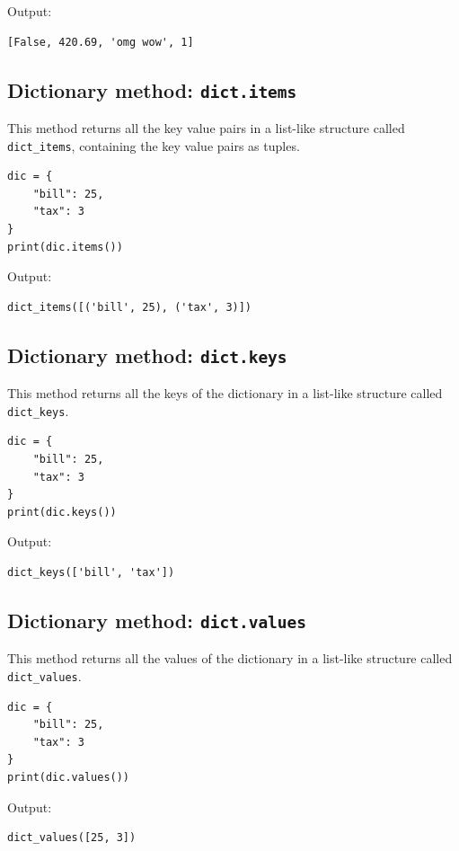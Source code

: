 \documentclass[11pt]{article}
\begin{document}
 \noindent Output:

\begin{verbatim}
[False, 420.69, 'omg wow', 1]
\end{verbatim}

\subsection{Dictionary method: \texttt{dict.items}}
\label{sec:orga9e6a05}
This method returns all the key value pairs in a list-like structure called \texttt{dict\_items}, containing the key value pairs as tuples.
\begin{verbatim}
dic = {
    "bill": 25,
    "tax": 3
}
print(dic.items())
\end{verbatim}

 \noindent Output:

\begin{verbatim}
dict_items([('bill', 25), ('tax', 3)])
\end{verbatim}

\subsection{Dictionary method: \texttt{dict.keys}}
\label{sec:org6e1f609}
This method returns all the keys of the dictionary in a list-like structure called \texttt{dict\_keys}.
\begin{verbatim}
dic = {
    "bill": 25,
    "tax": 3
}
print(dic.keys())
\end{verbatim}

 \noindent Output:

\begin{verbatim}
dict_keys(['bill', 'tax'])
\end{verbatim}

\subsection{Dictionary method: \texttt{dict.values}}
\label{sec:org8443165}
This method returns all the values of the dictionary in a list-like structure called \texttt{dict\_values}.
\begin{verbatim}
dic = {
    "bill": 25,
    "tax": 3
}
print(dic.values())
\end{verbatim}

 \noindent Output:

\begin{verbatim}
dict_values([25, 3])
\end{verbatim}
\end{document}
